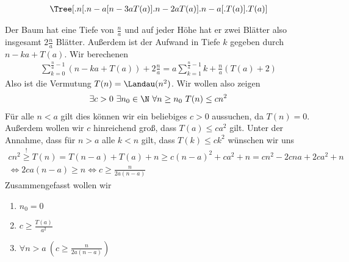 \begin{solution}

	\begin{align*}
	\Tree [.n [.n-a [ n-3a T(a) ].n-2a T(a) ].n-a [.T(a) ].T(a) ]
	\end{align*}
	
	Der Baum hat eine Tiefe von $\frac{n}{a}$ und auf jeder Höhe hat er zwei Blätter also insgesamt $2\frac{n}{a}$ Blätter. Außerdem ist der Aufwand in Tiefe $k$ gegeben durch $n - ka + T(a)$. Wir berechenen
	\begin{align*}
	\sum_{k=0}^{\frac{n}{a} - 1} (n - ka + T(a)) + 2 \frac{n}{a} = a \sum_{k = 1}^{\frac{n}{a} - 1} k + \frac{n}{a} (T(a) + 2) 
	\end{align*}
	Also ist die Vermutung $T(n) = \Landau(n^2)$. Wir wollen also zeigen
	\begin{align*}
	\exists c >0 \ \exists n_0 \in \N \ \forall n \geq n_0 \ T(n) \leq c n^2
	\end{align*}
	Für alle $n < a$ gilt dies können wir ein beliebiges $c > 0$ aussuchen, da $T(n) = 0$. Außerdem wollen wir $c$ hinreichend groß, dass $T(a) \leq c a^2$ gilt. Unter der Annahme, dass für $n > a$ alle $k < n$ gilt, dass $T(k) \leq c k^2$ wünschen wir uns
	\begin{align*}
	c n^2 \stackrel{!}{\geq} T(n) = T(n - a) + T(a) + n \geq c(n - a)^2 + ca^2 + n = cn^2 - 2cna + 2ca^2 + n \\ 
	\Leftrightarrow 2ca(n - a) \geq n \Leftrightarrow c \geq \frac{n}{2a(n - a)}
	\end{align*}
	Zusammengefasst wollen wir
	\begin{enumerate}
		\item $n_0 = 0$
		\item $c \geq \frac{T(a)}{a^2}$
		\item $\forall n > a \ (c \geq \frac{n}{2a(n - a)})$
	\end{enumerate}
\end{solution}

